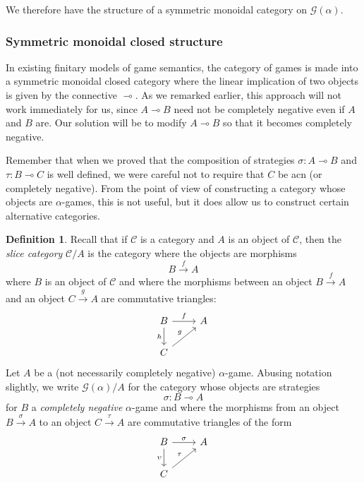 \documentclass[11pt]{article} %
\theoremstyle{plain} %
\theoremstyle{definition} %
\newtheorem{definition}[theorem]{Definition}
\theoremstyle{note}
\theoremstyle{exercisestyle}
\newcommand{\map}[3]{#2\xrightarrow{#1} #3}
\newcommand*\from{\colon}
\renewcommand{\implies}{\multimap}
\newcommand{\G}{\mathcal G}
\newcommand{\C}{{\mathcal{C}}}
\begin{document}
We therefore have the structure of a symmetric monoidal category on $\G(\alpha)$.  

\subsubsection{Symmetric monoidal closed structure}
\label{TransSMCCSex}

In existing finitary models of game semantics, the category of games is made into a symmetric monoidal closed category where the linear implication of two objects is given by the connective $\implies$.  As we remarked earlier, this approach will not work immediately for us, since $A\implies B$ need not be completely negative even if $A$ and $B$ are.  Our solution will be to modify $A\implies B$ so that it becomes completely negative.  

Remember that when we proved that the composition of strategies $\sigma\from A\implies B$ and $\tau\from B\implies C$ is well defined, we were careful not to require that $C$ be acn (or completely negative).  From the point of view of constructing a category whose objects are $\alpha$-games, this is not useful, but it does allow us to construct certain alternative categories.

\begin{definition}
  Recall that if $\C$ is a category and $A$ is an object of $\C$, then the \emph{slice category} $\C/A$ is the category where the objects are morphisms
  \[
    \map{f}{B}{A}
    \]
  where $B$ is an object of $\C$ and where the morphisms between an object $\map{f}{B}{A}$ and an object $\map{g}{C}{A}$ are commutative triangles:
  \[
    \begin{tikzcd}
      B \arrow[r, "f"] \arrow[d, "h"']
       & A \\
      C \arrow[ur, "g"]
        &
    \end{tikzcd}
    \]
  Let $A$ be a (not necessarily completely negative) $\alpha$-game.  Abusing notation slightly, we write $\G(\alpha)/A$ for the category whose objects are strategies
  \[
    \sigma\from B\implies A
    \]
  for $B$ a \emph{completely negative} $\alpha$-game and where the morphisms from an object $\map{\sigma}{B}{A}$ to an object $\map{\tau}{C}{A}$ are commutative triangles of the form
  \[
    \begin{tikzcd}
      B \arrow[r, "\sigma"] \arrow[d, "\upsilon"']
       & A \\
      C \arrow[ur, "\tau"]
        &
    \end{tikzcd}
    \]
\end{definition}
\end{document}
